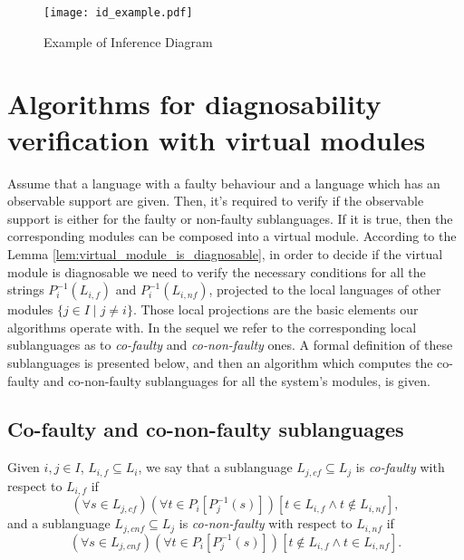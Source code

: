 \begin{figure}[!ht]
	\centering
	\texttt{[image: id\_example.pdf]}
	\caption{Example of Inference Diagram}
	\label{fig:id_example}
\end{figure}



\section{Algorithms for diagnosability verification with virtual modules}
\label{sec:algorithms}

Assume that a language with a faulty behaviour and a language which has an
observable support are given. Then, it's required to verify if the observable
support is either for the faulty or non-faulty sublanguages. If it is true, then the
corresponding modules can be composed into a virtual module.
According to the Lemma \ref{lem:virtual_module_is_diagnosable}, in order to
decide if the virtual module is diagnosable we need to verify the necessary
conditions for all the strings $P_i^{-1}(L_{i,f})$ and $P_i^{-1}(L_{i,nf})$,
projected to the local languages of other modules $\{j \in I\mid j \neq i\}$.
Those local projections are the basic elements our algorithms operate with. In the sequel we
refer to the corresponding local sublanguages as to \emph{co-faulty} and
\emph{co-non-faulty} ones. A formal definition of these sublanguages is
presented below, and then an algorithm which computes the co-faulty
and co-non-faulty sublanguages for all the system's modules, is given. 

\subsection{Co-faulty and co-non-faulty sublanguages}

\begin{definition}
\label{def:co-faulty}
Given $i, j \in I$, $L_{i,f} \subseteq L_i$,
we say that a sublanguage $L_{j,cf} \subseteq L_j$ is \emph{co-faulty} with
respect to $L_{i,f}$ if 
$$
	(\forall s \in L_{j,cf})(\forall t \in P_i[P_j^{-1}(s)])
	\left[
		t \in L_{i,f} \land t \not \in L_{i,nf}   
	\right],
$$ 
and a sublanguage $L_{j,cnf} \subseteq L_j$ is
\emph{co-non-faulty} with respect to $L_{i,nf}$ if 
$$
	(\forall s \in L_{j,cnf})(\forall t \in P_i[P_j^{-1}(s)])
	\left[
		t \not \in L_{i,f} \land t \in L_{i,nf}   
	\right].
$$ 
\end{definition}

